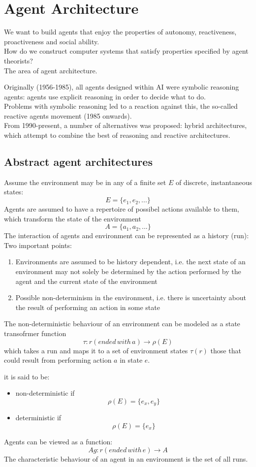 \chapter{Agent Architecture}
\minitoc
We want to build agents that enjoy the properties of autonomy, reactiveness, proactiveness and social ability.\\
How do we construct computer systems that satisfy properties specified by agent theorists?\\
The area of agent architecture.

Originally (1956-1985), all agents designed within AI were symbolic reasoning agents: agents use explicit reasoning in order to decide what to do.\\

Problems with symbolic reasoning led to a reaction against this, the so-called reactive agents movement (1985 onwards).\\
From 1990-present, a number of alternatives was proposed: hybrid architectures, which attempt to combine the best of reasoning and reactive architectures.
\section{Abstract agent architectures}
Assume the environment may be in any of a finite set $E$ of discrete, instantaneous states:
\[E = \{e_1, e_2, ...\}\]
Agents are assumed to have a repertoire of possibel actions available to them, which transform the state of the environment
\[A = \{a_1,a_2,...\}\]
The interaction of agents and environment can be represented as a history (run):
Two important points:
\begin{enumerate}
\item Environments are assumed to be history dependent, i.e. the next state of an environment may not solely be determined by the action performed by the agent and the current state of the environment
\item Possible non-determinism in the environment, i.e. there is uncertainty about the result of performing an action in some state
\end{enumerate}
The non-deterministic behaviour of an environment can be modeled as a state transofrmer function
\[\tau : r(ended\,with\,a)\rightarrow \rho(E)\]
which takes a run and maps it to a set of environment states $\tau(r)$ those that could result from performing action $a$ in state $e$.

it is said to be:
\begin{itemize}
\item non-deterministic if 
\[\rho(E) = \{e_x, e_y\}\]
\item deterministic if
\[\rho(E) = \{e_x\}\]
\end{itemize}
Agents can be viewed as a function:
\[Ag: r(ended \, with \, e)\rightarrow A\]
The characteristic behaviour of an agent in an environment is the set of all runs.

